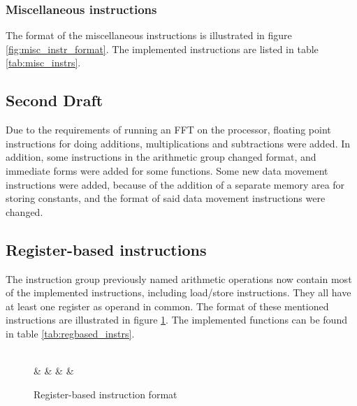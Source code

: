 


\subsubsection{Miscellaneous instructions}
The format of the miscellaneous instructions is illustrated in figure
\ref{fig:misc_instr_format}.
The implemented instructions are listed in table \ref{tab:misc_instrs}.




\FloatBarrier
\subsection{Second Draft}

Due to the requirements of running an FFT on the processor, floating point
instructions for doing additions, multiplications and subtractions were added.
In addition, some instructions in the arithmetic group changed format, and
immediate forms were added for some functions. Some new data movement
instructions were added, because of the addition of a separate memory area for
storing constants, and the format of said data movement instructions were
changed.

\subsection{Register-based instructions}

The instruction group previously named arithmetic operations now contain most of
the implemented instructions, including load/store instructions. They all have
at least one register as operand in common. The format of these mentioned
instructions are illustrated in figure \ref{fig:regbased_instrs_format}. The
implemented functions can be found in table \ref{tab:regbased_instrs}.

\begin{figure}[h]
	\centering
	\begin{bytefield}[endianness=big,bitwidth=0.05\linewidth]{16}
			\\
			&
			&
				&
			&
	\end{bytefield}

	\caption{Register-based instruction format}
	\label{fig:regbased_instrs_format}
\end{figure}

